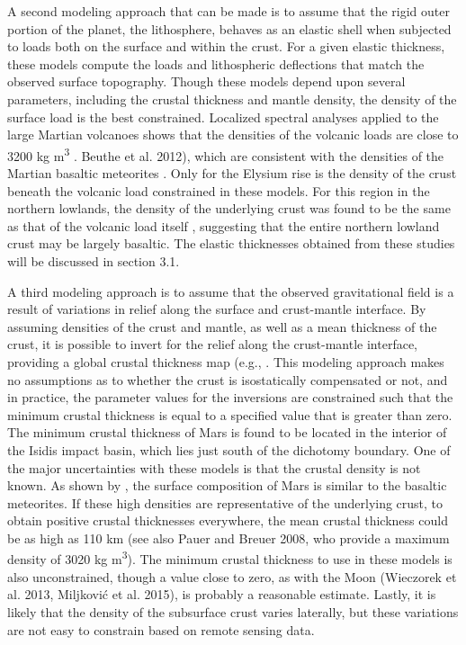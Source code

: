A second modeling approach that can be made is to assume that the rigid outer portion of the planet, the lithosphere, behaves as an elastic shell when subjected to loads both on the surface and within the crust. For a given elastic thickness, these models compute the loads and lithospheric deflections that match the observed surface topography. Though these models depend upon several parameters, including the crustal thickness and mantle density, the density of the surface load is the best constrained. Localized spectral analyses applied to the large Martian volcanoes shows that the densities of the volcanic loads are close to 3200 kg m\textsuperscript{3} \citep{McGovern2004, Belleguic2005, Grott2012}. Beuthe et al. 2012), which are consistent with the densities of the Martian basaltic meteorites \citep{Neumann2004}. Only for the Elysium rise is the density of the crust beneath the volcanic load constrained in these models. For this region in the northern lowlands, the density of the underlying crust was found to be the same as that of the volcanic load itself \citep{Belleguic2005}, suggesting that the entire northern lowland crust may be largely basaltic. The elastic thicknesses obtained from these studies will be discussed in section 3.1.\par
A third modeling approach is to assume that the observed gravitational field is a result of variations in relief along the surface and crust-mantle interface. By assuming densities of the crust and mantle, as well as a mean thickness of the crust, it is possible to invert for the relief along the crust-mantle interface, providing a global crustal thickness map (e.g., \citep{Neumann2004}. This modeling approach makes no assumptions as to whether the crust is isostatically compensated or not, and in practice, the parameter values for the inversions are constrained such that the minimum crustal thickness is equal to a specified value that is greater than zero. The minimum crustal thickness of Mars is found to be located in the interior of the Isidis impact basin, which lies just south of the dichotomy boundary. One of the major uncertainties with these models is that the crustal density is not known. As shown by \cite{Baratoux2014}, the surface composition of Mars is similar to the basaltic meteorites. If these high densities are representative of the underlying crust, to obtain positive crustal thicknesses everywhere, the mean crustal thickness could be as high as 110 km (see also Pauer and Breuer 2008, who provide a maximum density of 3020 kg m\textsuperscript{3}). The minimum crustal thickness to use in these models is also unconstrained, though a value close to zero, as with the Moon (Wieczorek et al. 2013, Miljković et al. 2015), is probably a reasonable estimate. Lastly, it is likely that the density of the subsurface crust varies laterally, but these variations are not easy to constrain based on remote sensing data.

